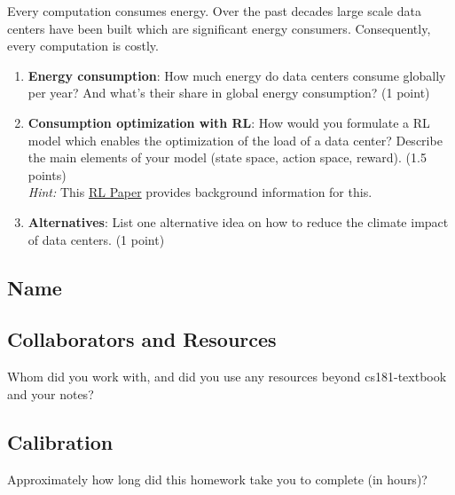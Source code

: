 \documentclass[submit]{harvardml}
\begin{document}


\newpage
\begin{problem}
Every computation consumes energy. Over the past decades large scale data centers have been built which are significant energy consumers. Consequently, every computation is costly.  

\begin{enumerate}
    \item \textbf{Energy consumption}: How much energy do data centers consume globally per year? And what's their share in global energy consumption? (1 point)
    \item \textbf{Consumption optimization with RL}: How would you formulate a RL model which enables the optimization of the load of a data center? Describe the main elements of your model (state space, action space, reward). (1.5 points)\\
   \textit{Hint:} This \href{https://people.csail.mit.edu/alizadeh/papers/deeprm-hotnets16.pdf}{RL Paper} provides background information for this.
   \item \textbf{Alternatives}: List one alternative idea on how to reduce the climate impact of data centers. (1 point)
\end{enumerate}
\end{problem}
    
\newpage
\subsection*{Name}
\subsection*{Collaborators and Resources}
Whom did you work with, and did you use any resources beyond cs181-textbook and your notes?
\subsection*{Calibration}
Approximately how long did this homework take you to complete (in hours)? 
\end{document}
